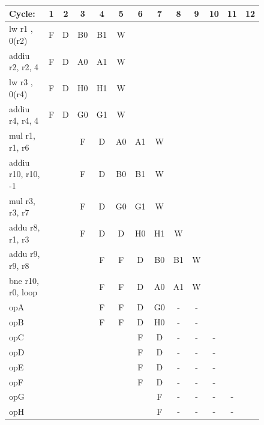 \documentclass[10pt]{article}
\begin{document}
\begin{figure}[H]
\centering
{\setlength{\tabcolsep}{2pt}
\begin{tabular}{|l|c|c|c|c!{\vrule width 1.5pt}c|c|c|c|c|c|c!{\vrule width 1.5pt}c|}
\hline
Cycle:            & 1  & 2  & 3  & 4  & 5  & 6  & 7  & 8  & 9  & 10 & 11 & 12 \\ \hline
lw r1 , 0(r2)     & F  & D  & B0 & B1 & W  &    &    &    &    &    &    &    \\ \hline
addiu r2, r2, 4   & F  & D  & A0 & A1 & W  &    &    &    &    &    &    &    \\ \hline
lw r3 , 0(r4)     & F  & D  & H0 & H1 & W  &    &    &    &    &    &    &    \\ \hline
addiu r4, r4, 4   & F  & D  & G0 & G1 & W  &    &    &    &    &    &    &    \\ \hline
mul r1, r1, r6    &    &    & F  & D  & A0 & A1 & W  &    &    &    &    &    \\ \hline
addiu r10, r10, -1&    &    & F  & D  & B0 & B1 & W  &    &    &    &    &    \\ \hline
mul r3, r3, r7    &    &    & F  & D  & G0 & G1 & W  &    &    &    &    &    \\ \hline
addu r8, r1, r3   &    &    & F  & D  & D  & H0 & H1 & W  &    &    &    &    \\ \hline
addu r9, r9, r8   &    &    &    & F  & F  & D  & B0 & B1 & W  &    &    &    \\ \hline
bne r10, r0, loop &    &    &    & F  & F  & D  & A0 & A1 & W  &    &    &    \\ \hline
opA               &    &    &    & F  & F  & D  & G0 & -  & -  &    &    &    \\ \hline
opB               &    &    &    & F  & F  & D  & H0 & -  & -  &    &    &    \\ \hline
opC               &    &    &    &    &    & F  & D  & -  & -  & -  &    &    \\ \hline
opD               &    &    &    &    &    & F  & D  & -  & -  & -  &    &    \\ \hline
opE               &    &    &    &    &    & F  & D  & -  & -  & -  &    &    \\ \hline
opF               &    &    &    &    &    & F  & D  & -  & -  & -  &    &    \\ \hline
opG               &    &    &    &    &    &    & F  & -  & -  & -  & -  &    \\ \hline
opH               &    &    &    &    &    &    & F  & -  & -  & -  & -  &    \\ \hline

\end{tabular}}
\end{figure}
\end{document}
